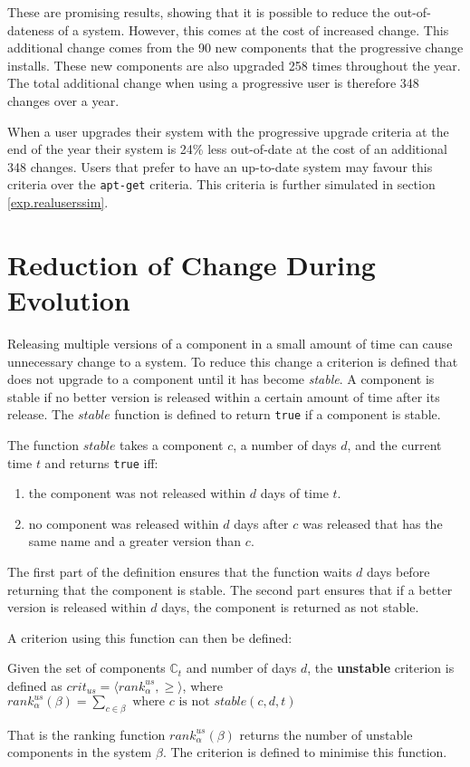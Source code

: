 These are promising results, showing that it is possible to reduce the out-of-dateness of a system.
However, this comes at the cost of increased change.
This additional change comes from the 90 new components that the progressive change installs.
These new components are also upgraded 258 times throughout the year.
The total additional change when using a progressive user is therefore 348 changes over a year.  

When a user upgrades their system with the progressive upgrade criteria at the end of the year their system is 24\% less out-of-date at the cost of an additional 348 changes.
Users that prefer to have an up-to-date system may favour this criteria over the \texttt{apt-get} criteria. 
This criteria is further simulated in section \ref{exp.realuserssim}.

\section{Reduction of Change During Evolution}
\label{exp.q3}
Releasing multiple versions of a component in a small amount of time can cause unnecessary change to a system.
To reduce this change a criterion is defined that does not upgrade to a component until it has become \textit{stable}.
A component is stable if no better version is released within a certain amount of time after its release.
The $stable$ function is defined to return \texttt{true} if a component is stable.
\begin{defs}
\label{exp.stablefunction}
The function $stable$ takes a component $c$, a number of days $d$, and the current time $t$ and returns \texttt{true} iff:
\begin{enumerate}
  \item the component was not released within $d$ days of time $t$.
  \item no component was released within $d$ days after $c$ was released that has the same name and a greater version than $c$.
\end{enumerate}
\end{defs}
The first part of the definition ensures that the function waits $d$ days before returning that the component is stable.
The second part ensures that if a better version is released within $d$ days, the component is returned as not stable.

A criterion using this function can then be defined:
\begin{defs}
	Given the set of components $\mathbb{C}_t$ and number of days $d$, the \textbf{unstable} criterion is defined as $crit_{us} = \langle rank^{us}_{\alpha}, \geq \rangle$,
	where \\$rank^{us}_{\alpha}(\beta) = \sum_{c \in \beta} \text{ where } c \text{ is not }stable(c,d,t)$
\end{defs}
That is the ranking function $rank^{us}_{\alpha}(\beta)$ returns the number of unstable components in the system $\beta$.
The criterion is defined to minimise this function. 


